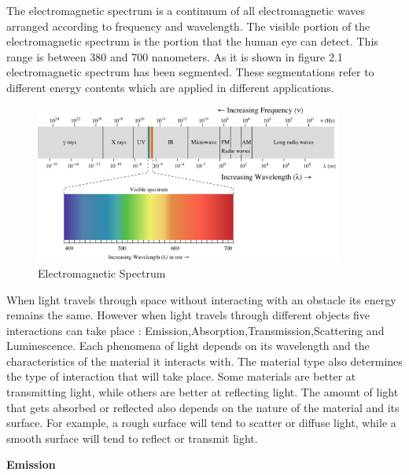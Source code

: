 \documentclass{article}
\begin{document}
{                The electromagnetic spectrum is a continuum of all electromagnetic waves arranged according to frequency and wavelength. The visible portion of the electromagnetic spectrum is the portion that the human eye can detect. This range is between 380 and 700 nanometers. As it is shown in figure 2.1 electromagnetic spectrum has been segmented. These segmentations refer to different energy contents which are applied in different applications.\par
                
                \begin{figure}[htb]
                    \centering
                    \includegraphics[width=0.9\textwidth]{Figures/electromagneticSpectrum.PNG}
                    \caption{Electromagnetic Spectrum}
                    \label{fig:example}
                \end{figure}
                
                When light travels through space without interacting with an obstacle its energy remains the same. However when light travels through different objects five interactions can take place : Emission,Absorption,Transmission,Scattering and Luminescence. Each phenomena of light depends on its wavelength and the characteristics of the material it interacts with. The material type also determines the type of interaction that will take place. Some materials are better at transmitting light, while others are better at reflecting light. The amount of light that gets absorbed or reflected also depends on the nature of the material and its surface. For example, a rough surface will tend to scatter or diffuse light, while a smooth surface will tend to reflect or transmit light.\par
                \vspace*{1\baselineskip}
                
                \textbf{Emission}
                \vspace*{1\baselineskip}
                
}
\end{document}
